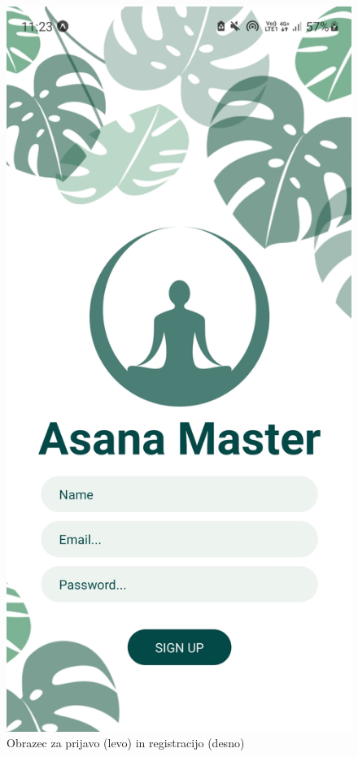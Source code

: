 \documentclass[a4paper, 12pt]{book}
\begin{document}
\begin{figure}[!tbp]
\begin{minipage}[b]{0.35\textwidth}
    \label{prijava}
  \end{minipage}
  \begin{minipage}[b]{0.35\textwidth}
    \includegraphics[width=\textwidth]{registracija.jpg}\centering
  \end{minipage}
    \caption{Obrazec za prijavo (levo) in registracijo (desno)}



\end{figure}
\end{document}
